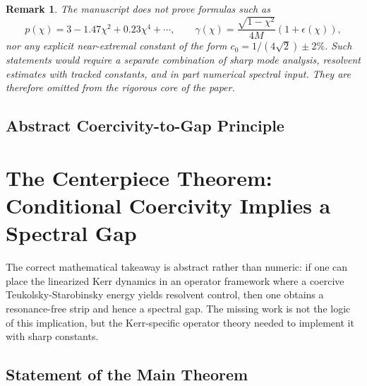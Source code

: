 \documentclass[12pt,a4paper]{article}
\newtheorem{remark}[theorem]{Remark}
\begin{document}
\begin{remark}
The manuscript does not prove formulas such as
\begin{equation}
p(\chi)=3-1.47\chi^2+0.23\chi^4+\cdots,
\qquad
\gamma(\chi)=\frac{\sqrt{1-\chi^2}}{4M}(1+\epsilon(\chi)),
\end{equation}
nor any explicit near-extremal constant of the form $c_0=1/(4\sqrt2)\pm 2\%$. Such statements would require a separate combination of sharp mode analysis, resolvent estimates with tracked constants, and in part numerical spectral input. They are therefore omitted from the rigorous core of the paper.
\end{remark}

\subsection{Abstract Coercivity-to-Gap Principle}

\section{The Centerpiece Theorem: Conditional Coercivity Implies a Spectral Gap}

The correct mathematical takeaway is abstract rather than numeric: if one can place the linearized Kerr dynamics in an operator framework where a coercive Teukolsky-Starobinsky energy yields resolvent control, then one obtains a resonance-free strip and hence a spectral gap. The missing work is not the logic of this implication, but the Kerr-specific operator theory needed to implement it with sharp constants.

\subsection{Statement of the Main Theorem}
\end{document}
